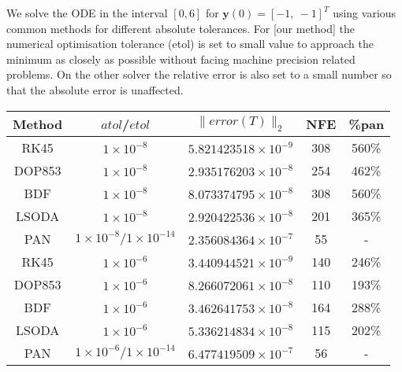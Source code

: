 \documentclass{article}
\begin{document}
    We solve the ODE in the interval $[0,6]$ for $\pmb{y}(0) = [-1,\ -1]^T$ using various common methods for
    different absolute tolerances.
    For [our method] the numerical optimisation tolerance (etol) is set to small value to approach the minimum as
    closely as possible without facing machine precision related problems.
    On the other solver the relative error is also set to a small number so that the absolute error is unaffected.

    \begin{center}
    {\tabulinesep=1.2mm
        \label{tol_table}
        \begin{tabu}{ |c| c| c| c| c| }
            \hline
            Method & $atol$/$etol$                          & $ \lVert error(T) \rVert_{2}$  & NFE & \%pan \\
            \hline
            RK45   & $1 \times 10^{-8}$                     & $ 5.821423518 \times 10^{-9} $ & 308 & 560\% \\
            \hline
            DOP853 & $1 \times 10^{-8}$                     & $ 2.935176203 \times 10^{-8} $ & 254 & 462\% \\
            \hline
            BDF    & $1 \times 10^{-8}$                     & $ 8.073374795 \times 10^{-8} $ & 308 & 560\% \\
            \hline
            LSODA  & $1 \times 10^{-8}$                     & $ 2.920422536 \times 10^{-8} $ & 201 & 365\% \\
            \hline
            PAN    & $1 \times 10^{-8} / 1 \times 10^{-14}$ & $ 2.356084364 \times 10^{-7} $ & 55  & -     \\
            \hline
            RK45   & $1 \times 10^{-6}$                     & $ 3.440944521 \times 10^{-9} $ & 140 & 246\% \\
            \hline
            DOP853 & $1 \times 10^{-6}$                     & $ 8.266072061 \times 10^{-8} $ & 110 & 193\% \\
            \hline
            BDF    & $1 \times 10^{-6}$                     & $  3.462641753\times 10^{-8} $   & 164 & 288\% \\
            \hline
            LSODA  & $1 \times 10^{-6}$                     & $  5.336214834\times 10^{-8} $   & 115 & 202\% \\
            \hline
            PAN    & $1 \times 10^{-6} / 1 \times 10^{-14}$ & $6.477419509 \times 10^{-7} $  & 56  & -     \\
            \hline
        \end{tabu}
    }
    \end{center}
\end{document}
